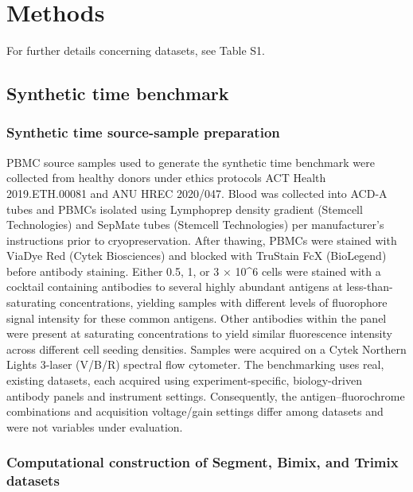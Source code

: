 \documentclass[ASNA]{latex/wiley/USG}
\begin{document}
\section{Methods}\label{methods}

For further details concerning datasets, see Table S1.

\subsection{Synthetic time benchmark}\label{synthetic-time-benchmark}

\subsubsection{Synthetic time source-sample
preparation}\label{synthetic-time-source-sample-preparation}

PBMC source samples used to generate the synthetic time benchmark were
collected from healthy donors under ethics protocols ACT Health
2019.ETH.00081 and ANU HREC 2020/047. Blood was collected into ACD-A
tubes and PBMCs isolated using Lymphoprep density gradient (Stemcell
Technologies) and SepMate tubes (Stemcell Technologies) per
manufacturer's instructions prior to cryopreservation. After thawing,
PBMCs were stained with ViaDye Red (Cytek Biosciences) and blocked with
TruStain FcX (BioLegend) before antibody staining. Either 0.5, 1, or 3 ×
10\^{}6 cells were stained with a cocktail containing antibodies to
several highly abundant antigens at less-than-saturating concentrations,
yielding samples with different levels of fluorophore signal intensity
for these common antigens. Other antibodies within the panel were
present at saturating concentrations to yield similar fluorescence
intensity across different cell seeding densities. Samples were acquired
on a Cytek Northern Lights 3-laser (V/B/R) spectral flow cytometer. The
benchmarking uses real, existing datasets, each acquired using
experiment-specific, biology-driven antibody panels and instrument
settings. Consequently, the antigen--fluorochrome combinations and
acquisition voltage/gain settings differ among datasets and were not
variables under evaluation.

\subsubsection{Computational construction of Segment, Bimix, and Trimix
datasets}\label{computational-construction-of-segment-bimix-and-trimix-datasets}
\end{document}
